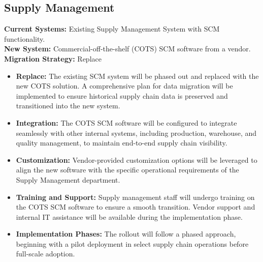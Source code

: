 \subsection{Supply Management}
\textbf{Current Systems:} Existing Supply Management System with SCM functionality. \\
\textbf{New System:} Commercial-off-the-shelf (COTS) SCM software from a vendor. \\
\textbf{Migration Strategy:} Replace
\begin{itemize}
    \item \textbf{Replace:} The existing SCM system will be phased out and replaced with the new COTS solution. A comprehensive plan for data migration will be implemented to ensure historical supply chain data is preserved and transitioned into the new system.
    \item \textbf{Integration:} The COTS SCM software will be configured to integrate seamlessly with other internal systems, including production, warehouse, and quality management, to maintain end-to-end supply chain visibility.
    \item \textbf{Customization:} Vendor-provided customization options will be leveraged to align the new software with the specific operational requirements of the Supply Management department.
    \item \textbf{Training and Support:} Supply management staff will undergo training on the COTS SCM software to ensure a smooth transition. Vendor support and internal IT assistance will be available during the implementation phase.
    \item \textbf{Implementation Phases:} The rollout will follow a phased approach, beginning with a pilot deployment in select supply chain operations before full-scale adoption.
\end{itemize}


